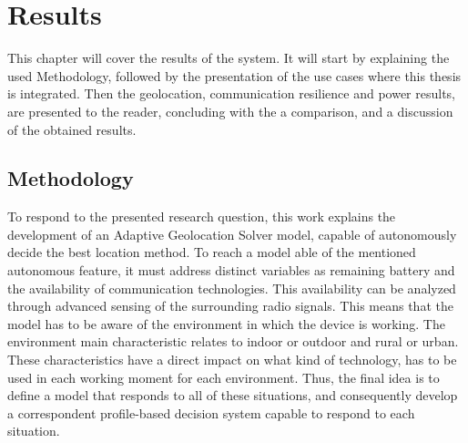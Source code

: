 

\chapter{Results}
\label{cha:Results}
This chapter will cover the results of the system.  It will start by explaining the used Methodology, followed by the presentation of the use cases where this thesis is integrated.
Then the geolocation, communication resilience and power results, are presented to the reader, concluding with the a comparison, and a discussion of the obtained results.


\section{Methodology}
\label{sec:methodology}

To respond to the  presented  research question, this work explains the development of an Adaptive Geolocation Solver model, capable of autonomously decide the best location method. To reach a model able of the mentioned autonomous feature, it must address distinct variables as remaining battery and the availability of communication technologies. This availability can be analyzed through advanced sensing of the surrounding radio signals. This means that the model has to be aware of the environment in which the device is working. The environment main characteristic relates to indoor or outdoor and rural or urban. 
These characteristics have a direct impact on what kind of technology, has to be used in each working moment for each environment. Thus, the final idea is to define a model that responds to all of these situations, and consequently develop a correspondent profile-based decision system capable to respond to each situation.


